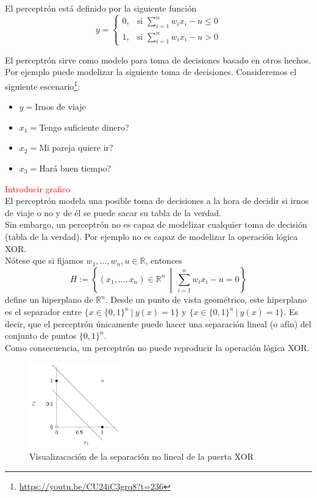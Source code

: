 \documentclass{article}
\begin{document}
El perceptrón está definido por la siguiente función
$$y=\begin{cases}
0, & \text{si } \sum_{i=1}^nw_ix_i-u\leq 0\\
1, & \text{si } \sum_{i=1}^nw_ix_i-u>0
\end{cases}$$

El perceptrón sirve como modelo para toma de decisiones basado en otros hechos. Por ejemplo puede modelizar la siguiente toma de decisiones. Consideremos el siguiente escenario\footnote{\url{https://youtu.be/CU24iC3grq8?t=236}}:

\begin{itemize}
\item $y=$Irnos de viaje
\item $x_1=$Tengo suficiente dinero?
\item $x_2=$Mi pareja quiere ir?
\item $x_3=$Hará buen tiempo?
\end{itemize}

\textcolor{red}{Introducir grafico}\\

El perceptrón modela una posible toma de decisiones a la hora de decidir si irnos de viaje o no y de él se puede sacar su tabla de la verdad.\\

Sin embargo, un perceptrón no es capaz de modelizar cualquier toma de decisión (tabla de la verdad). Por ejemplo no es capaz de modelizar la operación lógica XOR.\\


Nótese que si fijamos $w_1,\hdots,w_n,u\in\mathbb{R} $, entonces
$$H:=\left\{(x_1,\hdots,x_n)\in\mathbb{R}^n \ \middle| \ \sum_{i=1}^nw_ix_i-u= 0\right\} $$
define un hiperplano de $\mathbb{R}^n$. Desde un punto de vista geométrico, este hiperplano es el separador entre $\{x\in\{0,1\}^n \ | \ y(x)=1\} $ y $\{x\in\{0,1\}^n \ | \ y(x)=1\} $. Es decir, que el perceptrón únicamente puede hacer una separación lineal (o afín) del conjunto de puntos $\{0,1\}^n $.\\

Como consecuencia, un perceptrón no puede reproducir la operación lógica XOR.
\begin{figure}[htbp]
\centering
\includegraphics[width=4cm]{imagenes/XOR.png}
\caption{Visualizacación de la separación no lineal de la puerta XOR}
\end{figure}
\end{document}
